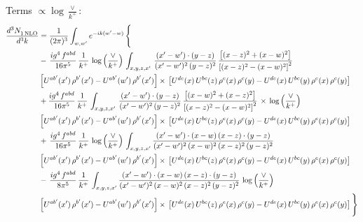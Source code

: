 \documentclass[10pt]{article}
\numberwithin{equation}{section}
\begin{document}
\noindent Terms $\propto\log\frac{\vee}{k^+}$:
\begin{align}
   \frac{d^{3}N_{1\,\rm NLO}^{\rm}}{d^{3}k}  & =  \frac{1}{(2\pi)^{3}}  \int_{w, w^\prime} e^{-ik(w^\prime-w)}\, \Bigg\{\notag \\
& -\,\frac{ig^{4}\,f^{abd}}{16\pi^{5}}\,\frac{1}{k^{+}}\,\log{\left(\frac{\vee}{k^{+}}\right)}\,\int_{x,y,z,x'}\, \frac{(x'-w')\cdot (y-z)}{(x'-w')^{2}\,(y-z)^{2}}\,\frac{\left[(x-z)^{2}+(x-w)^{2}\right]}{\left[(x-z)^{2}-(x-w)^{2}\right]^{2}}\notag \\ & \left[U^{ab'}(x')\,\rho^{b'}(x')-U^{ab'}(w')\, \rho^{b'}(x')\right]\times\, \left[U^{de}(x)\,U^{bc}(z)\, \rho^{e}(x)\,\rho^{c}(y)-U^{de}(x)\,U^{bc}(y)\,\rho^{e}(x)\,\rho^{c}(y)\right] \notag \\
&  +\frac{ig^{4}\,f^{abd}}{16\pi^{5}}\, \frac{1}{k^{+}}\,\int_{x,y,z,x'}\, \frac{(x'-w')\cdot (y-z)}{(x'-w')^{2}\,(y-z)^{2}}\, \frac{\left[(x-w)^{2}+(x-z)^{2}\right]}{\left[(x-z)^{2}-(x-w)^{2}\right]^{2}}\, \times\, \log{\left(\frac{\vee}{k^{+}}\right)}\notag \\ & \left[U^{ab'}(x')\,\rho^{b'}(x')-U^{ab'}(w')\, \rho^{b'}(x')\right]\times\, \left[U^{de}(x)\,U^{bc}(z)\, \rho^{e}(x)\,\rho^{c}(y)-U^{de}(x)\,U^{bc}(y)\,\rho^{e}(x)\,\rho^{c}(y)\right] \notag \\
& +\, \frac{ig^{4}\,f^{abd}}{16\pi^{5}}\,\frac{1}{k^{+}}\,\log{\left(\frac{\vee}{k^{+}}\right)}\,\int_{x,y,z,x'} \frac{(x'-w')\cdot (x-w)\, (x-z)\cdot (y-z)}{(x'-w')^{2}\, (x-w)^{2}\, (x-z)^{2}\, (y-z)^{2}}\, \notag \\ & \left[U^{ab'}(x')\,\rho^{b'}(x')-U^{ab'}(w')\, \rho^{b'}(x')\right]\times\, \left[U^{de}(x)\,U^{bc}(z)\, \rho^{e}(x)\,\rho^{c}(y)-U^{de}(x)\,U^{bc}(y)\,\rho^{e}(x)\,\rho^{c}(y)\right] \notag \\
&-\, \frac{ig^{4}\,f^{abd}}{8\pi^{5}}\,\frac{1}{k^{+}}\,\int_{x,y,z,x'}\frac{(x'-w')\cdot (x-w)\, (x-z)\cdot (y-z)}{(x'-w')^{2}\, (x-w)^{2}\, (x-z)^{2}\, (y-z)^{2}}\,\log{\left(\frac{\vee}{k^{+}}\right)} \notag \\ & \left[U^{ab'}(x')\,\rho^{b'}(x')-U^{ab'}(w')\, \rho^{b'}(x')\right]\times\, \left[U^{de}(x)\,U^{bc}(z)\, \rho^{e}(x)\,\rho^{c}(y)-U^{de}(x)\,U^{bc}(y)\,\rho^{e}(x)\,\rho^{c}(y)\right]\Bigg\} \label{eq:B:G1IIIN1}
\end{align}
\end{document}
